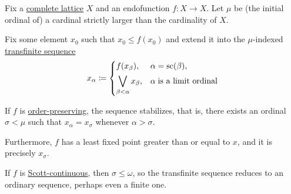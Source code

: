 \begin{theorem}\label{thm:knaster_tarski_iteration}
  Fix a \hyperref[def:complete_lattice]{complete lattice} \( X \) and an endofunction \( f: X \to X \). Let \( \mu \) be (the initial ordinal of) a cardinal strictly larger than the cardinality of \( X \).

  Fix some element \( x_0 \) such that \( x_0 \leq f(x_0) \) and extend it into the \( \mu \)-indexed \hyperref[def:transfinite_sequence]{transfinite sequence}
  \begin{equation*}
    x_\alpha \coloneqq \begin{dcases}
      f(x_\beta),                       &\alpha = \op{sc}(\beta), \\
      \bigvee_{\beta < \alpha} x_\beta, &\alpha \T{is a limit ordinal} \\
    \end{dcases}
  \end{equation*}

  \begin{thmenum}
     If \( f \) is \hyperref[def:order_function]{order-preserving}, the sequence stabilizes, that is, there exists an ordinal \( \sigma < \mu \) such that \( x_\alpha = x_\sigma \) whenever \( \alpha > \sigma \).

     Furthermore, \( f \) has a least fixed point greater than or equal to \( x \), and it is precisely \( x_\sigma \).

     If \( f \) is \hyperref[def:scott_continuity]{Scott-continuous}, then \( \sigma \leq \omega \), so the transfinite sequence reduces to an ordinary sequence, perhaps even a finite one.
  \end{thmenum}
\end{theorem}
